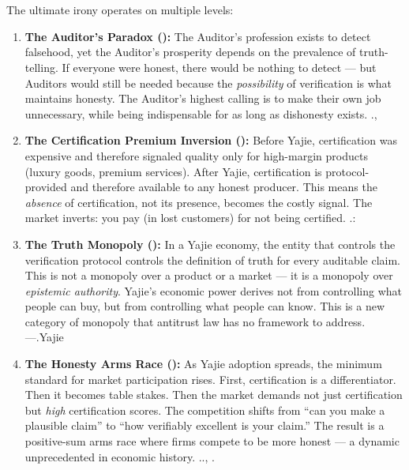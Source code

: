 \documentclass[12pt,a4paper]{article}
\theoremstyle{remark}
\begin{document}
\section{}
The ultimate irony operates on multiple levels:
\begin{enumerate}[label=\textbf{ \arabic*}, leftmargin=*]
 \item \textbf{The Auditor's Paradox ():} The Auditor's profession exists 
 to detect falsehood, yet the Auditor's prosperity depends on the prevalence of 
 truth-telling. If everyone were honest, there would be nothing to detect --- but 
 Auditors would still be needed because the \textit{possibility} of verification 
 is what maintains honesty. The Auditor's highest calling is to make their own 
 job unnecessary, while being indispensable for as long as dishonesty exists.
 \textit{}., 
 \item \textbf{The Certification Premium Inversion ():} Before Yajie, 
 certification was expensive and therefore signaled quality only for high-margin 
 products (luxury goods, premium services). After Yajie, certification is 
 protocol-provided and therefore available to any honest producer. This means 
 the \textit{absence} of certification, not its presence, becomes the costly 
 signal. The market inverts: you pay (in lost customers) for not being certified.
 \textit{}.: 
 \item \textbf{The Truth Monopoly ():} In a Yajie economy, the entity that 
 controls the verification protocol controls the definition of truth for every 
 auditable claim. This is not a monopoly over a product or a market --- it is a 
 monopoly over \textit{epistemic authority}. Yajie's economic power derives not 
 from controlling what people can buy, but from controlling what people can know.
 This is a new category of monopoly that antitrust law has no framework to address.
 ---\textit{}.Yajie
 \item \textbf{The Honesty Arms Race ():} As Yajie adoption spreads, 
 the minimum standard for market participation rises. First, certification is 
 a differentiator. Then it becomes table stakes. Then the market demands not 
 just certification but \textit{high} certification scores. The competition 
 shifts from ``can you make a plausible claim'' to ``how verifiably excellent 
 is your claim.'' The result is a positive-sum arms race where firms compete 
 to be more honest --- a dynamic unprecedented in economic history.
.., \textit{}.
\end{enumerate}
\end{document}
